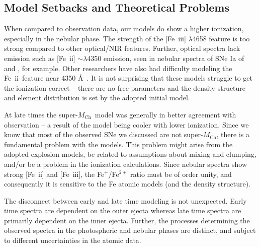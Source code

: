 \documentclass[useAMS,usenatbib,useasmath]{mnras}
\newcommand{\Mch}{\hbox{$M_{\text{Ch}}$}}
\newcommand{\feii}{\mbox{Fe~{\sc ii}}}
\newcommand{\feiii}{\mbox{Fe~{\sc iii}}}
\newcommand{\lb}{$\lambda$}
\begin{document}
\subsection{Model Setbacks and Theoretical Problems} \label{section_problems}%
When compared to observation data, our models do show a higher ionization, especially in the nebular phase. The strength of the [\feiii] \lb4658 feature is too strong compared to other optical/NIR features. Further, optical spectra lack emission such as [\feii] $\sim$\lb4350 emission,  seen in nebular spectra of SNe Ia of \cite{Taubenberger2013} and \cite{Black2016}, for example. Other researchers have also had difficulty modeling the \feii\ feature near 4350 \AA\ 
\citep[Spyromillo 2016, private communication; Sim 2016, private communication; ][]{Mazzali2015,Friesen2017}. It is not surprising that these models struggle to get the ionization correct -- there are no free parameters and the density structure and element distribution is set by the adopted initial model.

At late times the super-\Mch\ model was generally in better agreement with observation -- a result of the model being cooler with lower ionization. Since we know that most of the observed SNe we discussed are not super-\Mch, there is a fundamental problem with the models. This problem might arise from the adopted explosion models, be related to assumptions about mixing and clumping, and/or be a problem in the ionization calculations. Since nebular spectra show strong [\feii] and [\feiii], the Fe$^+$/Fe$^{2+}$ ratio must be of order unity, and consequently it is sensitive to the Fe atomic models (and the density structure). 

The disconnect between early and late time modeling is not unexpected. Early time spectra are dependent on the outer ejecta whereas late time spectra are primarily dependent on the inner ejecta. Further, the processes determining the observed spectra  in the photospheric and nebular phases are distinct, and subject to different uncertainties in the atomic data.
\end{document}
